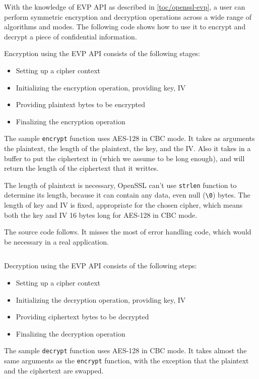 With the knowledge of EVP API as described in \autoref{toc/openssl-evp}, a user can perform symmetric encryption and decryption operations across a wide range of algorithms and modes. The following code shows how to use it to encrypt and decrypt a piece of confidential information.

Encryption using the EVP API consists of the following stages:

\begin{itemize}
  \item Setting up a cipher context
  \item Initializing the encryption operation, providing key, IV
  \item Providing plaintext bytes to be encrypted
  \item Finalizing the encryption operation
\end{itemize}

The sample \texttt{encrypt} function uses AES-128 in CBC mode. It takes as arguments the plaintext, the length of the plaintext, the key, and the IV. Also it takes in a buffer to put the ciphertext in (which we assume to be long enough), and will return the length of the ciphertext that it writtes.

The length of plaintext is necessary, OpenSSL can't use \texttt{strlen} function to determine its length, because it can contain any data, even null (\texttt{\textbackslash0}) bytes. The length of key and IV is fixed, appropriate for the chosen cipher, which means both the key and IV 16 bytes long for AES-128 in CBC mode.

The source code follows. It misses the most of error handling code, which would be necessary in a real application.

\inputminted{c}{code/openssl-evp-encrypt.c}

Decryption using the EVP API consists of the following steps:

\begin{itemize}
  \item Setting up a cipher context
  \item Initializing the decryption operation, providing key, IV
  \item Providing ciphertext bytes to be decrypted
  \item Finalizing the decryption operation
\end{itemize}

The sample \texttt{decrypt} function uses AES-128 in CBC mode. It takes almost the same arguments as the \texttt{encrypt} function, with the exception that the plaintext and the ciphertext are swapped.

